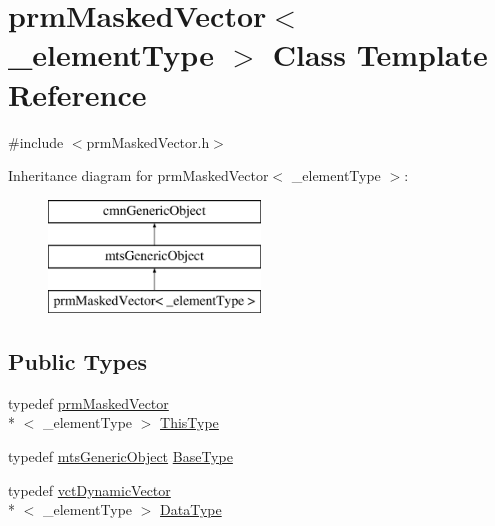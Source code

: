 \hypertarget{classprm_masked_vector}{\section{prm\-Masked\-Vector$<$ \-\_\-element\-Type $>$ Class Template Reference}
\label{classprm_masked_vector}
}


{\ttfamily \#include $<$prm\-Masked\-Vector.\-h$>$}

Inheritance diagram for prm\-Masked\-Vector$<$ \-\_\-element\-Type $>$\-:\begin{figure}[H]
\begin{center}
\leavevmode
\includegraphics[height=3.000000cm]{db/d1b/classprm_masked_vector}
\end{center}
\end{figure}
\subsection*{Public Types}
\begin{DoxyCompactItemize}
\item 
typedef \hyperlink{classprm_masked_vector}{prm\-Masked\-Vector}\\*
$<$ \-\_\-element\-Type $>$ \hyperlink{classprm_masked_vector_aaa6c739a3050e8d46d9a7234ed4edc69}{This\-Type}
\item 
typedef \hyperlink{classmts_generic_object}{mts\-Generic\-Object} \hyperlink{classprm_masked_vector_ad206ecada790ba4b049868d83fd2abc2}{Base\-Type}
\item 
typedef \hyperlink{classvct_dynamic_vector}{vct\-Dynamic\-Vector}\\*
$<$ \-\_\-element\-Type $>$ \hyperlink{classprm_masked_vector_a7699da34296337db788196d01482defb}{Data\-Type}
\end{DoxyCompactItemize}
